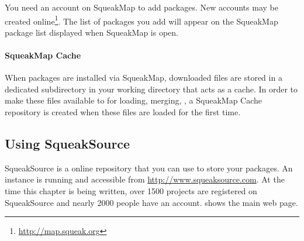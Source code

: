 \documentclass[a4paper,10pt,twoside]{book}
\begin{document}
You need an account on SqueakMap to add packages. New accounts may be created online\footnote{\url{http://map.squeak.org}}. The list of packages you add will appear on the SqueakMap package list displayed when SqueakMap is open.


\paragraph{SqueakMap Cache} When packages are installed via SqueakMap, downloaded files are stored in a dedicated subdirectory in your working directory that acts as a cache. In order to make these files available to \MC for loading, merging, \etc, a SqueakMap Cache repository is created when these files are loaded for the first time.






\subsection{Using SqueakSource}

SqueakSource is a online repository that you can use to store your \MC packages. An instance is running and accessible from \url{http://www.squeaksource.com}. At the time this chapter is being written, over 1500 projects are registered on SqueakSource and nearly 2000 people have an account.  shows the main web page.  
\end{document}
